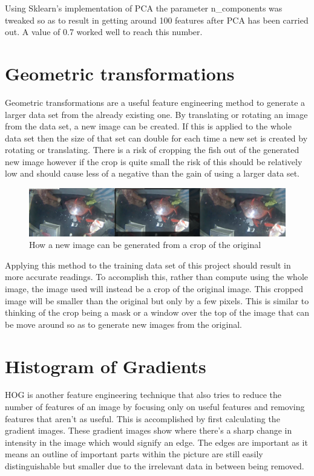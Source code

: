 \documentclass[notitlepage]{report}
\begin{document}
Using Sklearn's implementation of PCA the parameter n\_components was tweaked so as to result in getting around 100 features after PCA has been carried out. A value of 0.7 worked well to reach this number. 

\section{Geometric transformations}
Geometric transformations are a useful feature engineering method to generate a larger data set from the already existing one. By translating or rotating an image from the data set, a new image can be created. If this is applied to the whole data set then the size of that set can double for each time a new set is created by rotating or translating. There is a risk of cropping the fish out of the generated new image however if the crop is quite small the risk of this should be relatively low and should cause less of a negative than the gain of using a larger data set.
\begin{figure}[h!]
\centering
\includegraphics[scale=0.08]{example}
\caption{How a new image can be generated from a crop of the original}
\end{figure}

Applying this method to the training data set of this project should result in more accurate readings. To accomplish this, rather than compute using the whole image, the image used will instead be a crop of the original image. This cropped image will be smaller than the original but only by a few pixels. This is similar to thinking of the crop being a mask or a window over the top of the image that can be move around so as to generate new images from the original.

\section{Histogram of Gradients}
HOG is another feature engineering technique that also tries to reduce the number of features of an image by focusing only on useful features and removing features that aren't as useful. This is accomplished by first calculating the gradient images. These gradient images show where there's a sharp change in intensity in the image which would signify an edge. The edges are important as it means an outline of important parts within the picture are still easily distinguishable but smaller due to the irrelevant data in between being removed.
\end{document}

